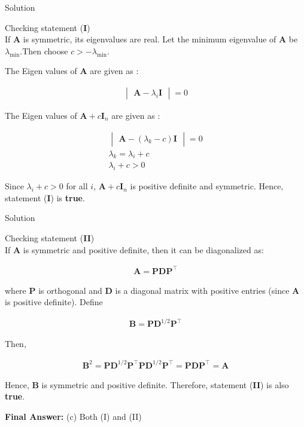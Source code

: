 \documentclass{beamer}
\numberwithin{equation}{section}
\theoremstyle{remark}
\newcommand{\mydet}[1]{\ensuremath{\begin{vmatrix}#1\end{vmatrix}}}
\let\vec\mathbf
\begin{document}
\begin{frame}{Solution}

Checking statement (\textbf{I}) \\
If $\vec{A}$ is symmetric, its eigenvalues are real. Let the minimum eigenvalue of $\vec{A}$ be $\lambda_{\min}$.Then choose $c > -\lambda_{\min}$.  

The Eigen values of $\vec{A}$ are given as :

\begin{align}
  \mydet{\vec{A}-\lambda_i\vec{I}} = 0
\end{align}

The Eigen values of $\vec{A} + c\vec{I}_n$ are given as :

\begin{align}
\mydet{\vec{A}-(\lambda_k-c)\vec{I}} = 0\\
\lambda_k = \lambda_i + c\\
\lambda_i + c > 0
\end{align}

Since $\lambda_i + c > 0$ for all $i$, $\vec{A} + c\vec{I}_n$ is positive definite and symmetric.  
Hence, statement (\textbf{I}) is \textbf{true}.

\end{frame}

\begin{frame}{Solution}

Checking statement (\textbf{II}) \\
If $\vec{A}$ is symmetric and positive definite, then it can be diagonalized as:

\begin{align}
\vec{A} = \vec{P}\vec{D}\vec{P}^\top
\end{align}

where $\vec{P}$ is orthogonal and $\vec{D}$ is a diagonal matrix with positive entries (since $\vec{A}$ is positive definite).  
Define

\begin{align}
\vec{B} = \vec{P}\vec{D}^{1/2}\vec{P}^\top
\end{align}

Then,

\begin{align}
\vec{B}^2 = \vec{P}\vec{D}^{1/2}\vec{P}^\top \vec{P}\vec{D}^{1/2}\vec{P}^\top = \vec{P}\vec{D}\vec{P}^\top = \vec{A}
\end{align}

Hence, $\vec{B}$ is symmetric and positive definite.  
Therefore, statement (\textbf{II}) is also \textbf{true}.

\textbf{Final Answer:} (c) Both (I) and (II)

\end{frame}
\end{document}
